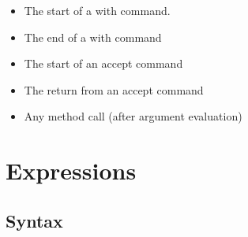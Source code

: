 \documentclass{article}%
\begin{document}
\begin{itemize}
\item The start of a with command.

\item The end of a with command

\item The start of an accept command

\item The return from an accept command

\item Any method call (after argument evaluation)
\end{itemize}

\section{Expressions}

\subsection{Syntax}
\end{document}
